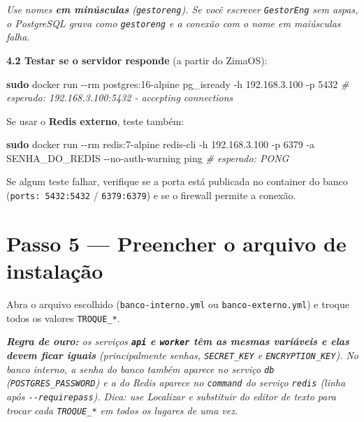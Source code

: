 \documentclass[
  10pt,
]{article}
\newenvironment{Shaded}{\begin{snugshade}}{\end{snugshade}}
\newcommand{\AttributeTok}[1]{\textcolor[rgb]{0.13,0.29,0.53}{#1}}
\newcommand{\CommentTok}[1]{\textcolor[rgb]{0.56,0.35,0.01}{\textit{#1}}}
\newcommand{\FunctionTok}[1]{\textcolor[rgb]{0.13,0.29,0.53}{\textbf{#1}}}
\newcommand{\NormalTok}[1]{#1}
\newcommand{\StringTok}[1]{\textcolor[rgb]{0.31,0.60,0.02}{#1}}
\renewenvironment{quote}{\begin{oldquote}\small\itshape}{\end{oldquote}}
\begin{document}
\begin{quote}
Use nomes \textbf{em minúsculas} (\texttt{gestoreng}). Se você escrever
\texttt{GestorEng} sem aspas, o PostgreSQL grava como \texttt{gestoreng}
e a conexão com o nome em maiúsculas falha.
\end{quote}

\textbf{4.2 Testar se o servidor responde} (a partir do ZimaOS):

\begin{Shaded}
\begin{Highlighting}[]
\FunctionTok{sudo}\NormalTok{ docker run }\AttributeTok{{-}{-}rm}\NormalTok{ postgres:16{-}alpine pg\_isready }\AttributeTok{{-}h}\NormalTok{ 192.168.3.100 }\AttributeTok{{-}p}\NormalTok{ 5432}
\CommentTok{\# esperado: 192.168.3.100:5432 {-} accepting connections}
\end{Highlighting}
\end{Shaded}

Se usar o \textbf{Redis externo}, teste também:

\begin{Shaded}
\begin{Highlighting}[]
\FunctionTok{sudo}\NormalTok{ docker run }\AttributeTok{{-}{-}rm}\NormalTok{ redis:7{-}alpine redis{-}cli }\AttributeTok{{-}h}\NormalTok{ 192.168.3.100 }\AttributeTok{{-}p}\NormalTok{ 6379 }\AttributeTok{{-}a} \StringTok{\textquotesingle{}SENHA\_DO\_REDIS\textquotesingle{}} \AttributeTok{{-}{-}no{-}auth{-}warning}\NormalTok{ ping}
\CommentTok{\# esperado: PONG}
\end{Highlighting}
\end{Shaded}

Se algum teste falhar, verifique se a porta está publicada no container
do banco (\texttt{ports:\ 5432:5432} / \texttt{6379:6379}) e se o
firewall permite a conexão.

\hypertarget{passo-5-preencher-o-arquivo-de-instalauxe7uxe3o}{%
\section{Passo 5 --- Preencher o arquivo de
instalação}\label{passo-5-preencher-o-arquivo-de-instalauxe7uxe3o}}

Abra o arquivo escolhido (\texttt{banco-interno.yml} ou
\texttt{banco-externo.yml}) e troque todos os valores
\texttt{TROQUE\_*}.

\begin{quote}
\textbf{Regra de ouro:} os serviços \textbf{\texttt{api} e
\texttt{worker} têm as mesmas variáveis e elas devem ficar iguais}
(principalmente senhas, \texttt{SECRET\_KEY} e
\texttt{ENCRYPTION\_KEY}). No banco interno, a senha do banco também
aparece no serviço \texttt{db} (\texttt{POSTGRES\_PASSWORD}) e a do
Redis aparece no \texttt{command} do serviço \texttt{redis} (linha após
\texttt{-\/-requirepass}). Dica: use \emph{Localizar e substituir} do
editor de texto para trocar cada \texttt{TROQUE\_*} em todos os lugares
de uma vez.
\end{quote}
\end{document}
